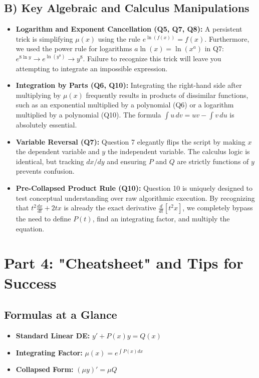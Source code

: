 \documentclass[11pt]{article}
\begin{document}
\subsection{B) Key Algebraic and Calculus Manipulations}
\begin{itemize}
    \item \textbf{Logarithm and Exponent Cancellation (Q5, Q7, Q8):} A persistent trick is simplifying $\mu(x)$ using the rule $e^{\ln(f(x))} = f(x)$. Furthermore, we used the power rule for logarithms $a\ln(x) = \ln(x^a)$ in Q7: $e^{8\ln y} \to e^{\ln(y^8)} \to y^8$. Failure to recognize this trick will leave you attempting to integrate an impossible expression.
    \item \textbf{Integration by Parts (Q6, Q10):} Integrating the right-hand side after multiplying by $\mu(x)$ frequently results in products of dissimilar functions, such as an exponential multiplied by a polynomial (Q6) or a logarithm multiplied by a polynomial (Q10). The formula $\int u \, dv = uv - \int v \, du$ is absolutely essential.
    \item \textbf{Variable Reversal (Q7):} Question 7 elegantly flips the script by making $x$ the dependent variable and $y$ the independent variable. The calculus logic is identical, but tracking $dx/dy$ and ensuring $P$ and $Q$ are strictly functions of $y$ prevents confusion.
    \item \textbf{Pre-Collapsed Product Rule (Q10):} Question 10 is uniquely designed to test conceptual understanding over raw algorithmic execution. By recognizing that $t^2 \frac{dx}{dt} + 2tx$ is already the exact derivative $\frac{d}{dt}[t^2 x]$, we completely bypass the need to define $P(t)$, find an integrating factor, and multiply the equation. 
\end{itemize}

\section{Part 4: "Cheatsheet" and Tips for Success}

\subsection{Formulas at a Glance}
\begin{itemize}
    \item \textbf{Standard Linear DE:} $y' + P(x)y = Q(x)$
    \item \textbf{Integrating Factor:} $\mu(x) = e^{\int P(x) dx}$
    \item \textbf{Collapsed Form:} $(\mu y)' = \mu Q$
\end{itemize}
\end{document}
